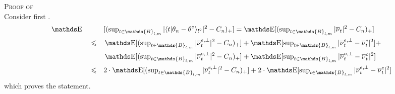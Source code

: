 \begin{pro}{\textsc{Proof of }\\}
Consider first .
\begin{alignat*}{3}
& \E && && [ (\sup\nolimits_{t \in \mathds{B}_{l, m}} \vert\langle t \vert \theta_{n} - \theta^{\circ}\rangle_{l^{2}} \vert^{2} - C_{n} )_{+} ] = \E[ (\sup\nolimits_{t \in \mathds{B}_{l, m}} \vert \overline{\nu}_{t} \vert^{2} - C_{n} )_{+} ]\notag\\
& && \leq && \E[ (\sup\nolimits_{t \in \mathds{B}_{l, m}} \vert \overline{\nu}^{e, \perp}_{t} \vert^{2} - C_{n} )_{+} ] + \E[ \sup\nolimits_{t \in \mathds{B}_{l, m}} \vert \overline{\nu}^{e, \perp}_{t} - \overline{\nu}^{e}_{t} \vert^{2} ] + \notag\\
& && &&\E[ (\sup\nolimits_{t \in \mathds{B}_{l, m}} \vert \overline{\nu}^{o, \perp}_{t} \vert^{2} - C_{n} )_{+} ] + \E[ \sup\nolimits_{t \in \mathds{B}_{l, m}} \vert \overline{\nu}^{o, \perp}_{t} - \overline{\nu}^{o}_{t} \vert^{2} ] \notag\\
& && \leq && 2 \cdot \E[ (\sup\nolimits_{t \in \mathds{B}_{l, m}} \vert \overline{\nu}^{e, \perp}_{t} \vert^{2} - C_{n} )_{+} ] + 2 \cdot \E[ \sup\nolimits_{t \in \mathds{B}_{l, m}} \vert \overline{\nu}^{e, \perp}_{t} - \overline{\nu}^{e}_{t} \vert^{2} ]
\end{alignat*}
which proves the statement.


\end{pro}
